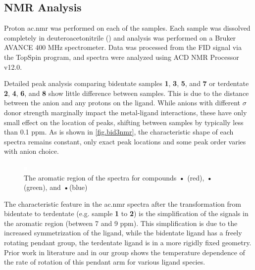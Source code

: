 \subsection{NMR Analysis}

Proton \gls{ac.nmr} was performed on each of the samples. Each sample was dissolved completely in deuteroacetonitrile () and analysis was performed on a Bruker AVANCE 400 MHz spectrometer. Data was processed from the FID signal via the TopSpin program, and spectra were analyzed using ACD NMR Processor v12.0. 

Detailed peak analysis comparing bidentate samples \textbf{1}, \textbf{3}, \textbf{5}, and \textbf{7} or terdentate \textbf{2}, \textbf{4}, \textbf{6}, and \textbf{8} show little difference between samples. This is due to the distance between the anion and any protons on the ligand. While anions with different $\sigma$ donor strength marginally impact the metal-ligand interactions, these have only small effect on the location of peaks, shifting between samples by typically less than 0.1 ppm. As is shown in \autoref{fig.bid3nmr}, the characteristic shape of each spectra remains constant, only exact peak locations and some peak order varies with anion choice. 

\begin{figure}[!htbp]
 \begin{center}
  \includegraphics[clip=true]{images/insertgraphic.eps}
 \end{center}
\caption[The aromatic region of the \texorpdfstring{}{1H} spectra of 3 bidentate compounds]{The aromatic region of the \texorpdfstring{}{1H} spectra for compounds \textbf{•} (red), \textbf{•} (green), and \textbf{•}(blue)}
\label{fig.bid3nmr}
\end{figure} 

The characteristic feature in the \gls{ac.nmr} spectra after the transformation from bidentate to terdentate (e.g. sample \textbf{1} to \textbf{2}) is the simplification of the signals in the aromatic region (between 7 and 9 ppm). This simplification is due to the increased symmetrization of the ligand, while the  bidentate ligand has a freely rotating pendant group, the  terdentate ligand is in a more rigidly fixed geometry. Prior work in literature and in our group shows the temperature dependence of the rate of rotation of this pendant arm for various ligand species. 


